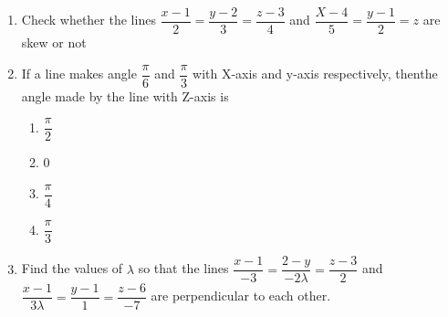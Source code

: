 \begin{enumerate}
\item Check  whether  the  lines  $\dfrac{x-1}{2} = \dfrac{y-2}{3} = \dfrac{z-3}{4}$  and  $\dfrac{X-4}{5} = \dfrac {y-1}{2} = z$ are skew or not
\item If a line makes angle $\dfrac{\pi}{6}$  and  $\dfrac{\pi}{3}$  with X-axis and y-axis respectively, thenthe angle made by the line with Z-axis is             
\begin{enumerate}                                     
\item $\dfrac{\pi}{2}$                                 
\item 0                                                
\item $\dfrac{\pi}{4}$                                 
\item $\dfrac{\pi}{3}$ 
\end{enumerate}
\item Find the values of $\lambda$ so that the lines $\dfrac{x-1}{-3} = \dfrac{2-y}{-2\lambda} = \dfrac{z-3}{ 2}$ and $\dfrac{x-1}{3\lambda} = \dfrac{y-1}{1} = \dfrac{z-6}{-7}$ are perpendicular to each other.
\end{enumerate}
